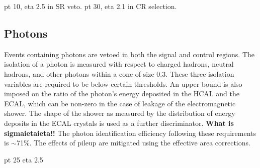 

pt 10, eta 2.5 in SR veto. pt 30, eta 2.1 in CR selection.

\subsection*{Photons}



Events containing photons are vetoed in both the signal and control regions. 
The isolation of a photon is measured with respect to charged 
hadrons, neutral hadrons, and other photons within a \detadphi cone of size 
$0.3$. These three isolation variables are required to be below certain 
thresholds. 
An upper bound is also imposed on the ratio of the photon's energy deposited in 
the HCAL and the ECAL, which can be non-zero in the case of leakage of the 
electromagnetic shower. The shape of the shower as measured by the distribution 
of energy deposits in the ECAL crystals is used as a further discriminator. 
\textbf{What is sigmaietaieta!!}
The photon identification efficiency following these requirements is 
$\sim$71\%. The effects of pileup are mitigated using the effective area 
corrections.


pt 25 eta 2.5

